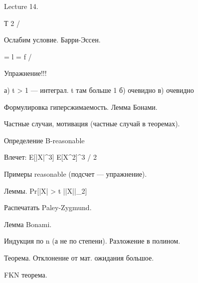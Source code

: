 Lecture 14.

Т 2 / \pi

Ослабим условие. Барри-Эссен.

\sigma = 
l = f / \sigma


Упражнение!!!

а) t > 1 --- интеграл. t  там больше 1
б) очевидно
в) очевидно


Формулировка гиперсжимаемость. Лемма Бонами.

Частные случаи, мотивация (частные случай в теоремах).



Определение B-reasonable

Влечет: E[|X|^3] \le {} E[X^2]^{3 / 2}


Примеры reasonable (подсчет --- упражнение).


Леммы. Pr[|X| > t ||X||_2]

Распечатать Paley-Zygmund.


Лемма Bonami.

Индукция по n (а не по степени).
Разложение в полином.


Теорема. Отклонение от мат. ожидания большое.

FKN теорема.